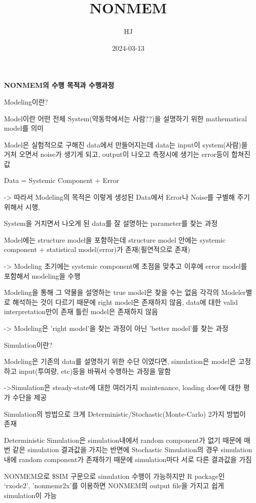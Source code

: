 \documentclass[
]{article}
\title{NONMEM}
\author{HJ}
\date{2024-03-13}
\begin{document}
\maketitle

\textbf{NONMEM의 수행 목적과 수행과정}

Modeling이란?

Model이란 어떤 전체 System(약동학에서는 사람??)을 설명하기 위한
mathematical model를 의미

Model은 실험적으로 구해진 data에서 만들어지는데 data는 input이
system(사람)을 거처 오면서 noise가 생기게 되고, output이 나오고 측정시에
생기는 error등이 합쳐진 값

Data = Systemic Component + Error

-\textgreater{} 따라서 Modeling의 목적은 이렇게 생성된 Data에서 Error나
Noise를 구별해 주기 위해서 시행,

System을 거치면서 나오게 된 data를 잘 설명하는 parameter를 찾는 과정

Model에는 structure model을 포함하는데 structure model 안에는 systemic
component + statistical model(error)가 존재(필연적으로 존재)

-\textgreater{} Modeling 초기에는 systemic component에 초점을 맞추고
이후에 error model를 포함해서 modeling을 수행

Modeling을 통해 그 약물을 설명하는 true model은 찾을 수는 없음 각각의
Modeler별로 해석하는 것이 다르기 때문에 right model은 존재하지 않음,
data에 대한 valid interpretation만이 존재 틀린 model은 존재하지 않음

-\textgreater{} Modeling은 'right model'을 찾는 과정이 아닌 'better
model'를 찾는 과정

Simulation이란?

Modeling은 기존의 data를 설명하기 위한 수단 이였다면, simulation은
model은 고정하고 input(투여량, etc)등을 바꿔서 수행하는 과정을 말함

-\textgreater Simulation은 steady-state에 대한 여러가지 maintenance,
loading dose에 대한 평가 수단을 제공

Simulation의 방법으로 크게 Deterministic/Stochastic(Monte-Carlo) 2가지
방법이 존재

Deterministic Simulation은 simulation내에서 random component가 없기
때문에 매번 같은 simulation 결과값을 가지는 반면에 Stochastic
Simulation의 경우 simulation내에 random component가 존재하기 때문에
simulation마다 서로 다른 결과값을 가짐

NONMEM으로 \$SIM 구문으로 simulation 수행이 가능하지만 R package인
`rxode2', 'nonmemr2x'를 이용하면 NONMEM의 output file을 가지고 쉽게
simulation이 가능
\end{document}
